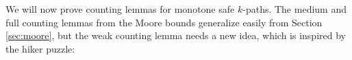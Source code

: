 \documentclass{article}\usepackage[a4paper,margin=20mm]{geometry}
\begin{document}






We will now prove counting lemmas for monotone safe $k$-paths.
The medium and full counting lemmas from the Moore bounds generalize easily from Section \ref{sec:moore}, but the weak counting lemma needs a new idea, which is inspired by the hiker puzzle:
\end{document}

